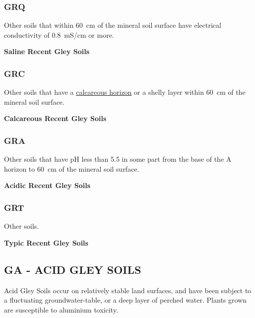 \documentclass[
  letterpaper,
  DIV=11,
  numbers=noendperiod]{scrreprt}
\begin{document}
\hypertarget{sec-key-GRQ}{%
\subsubsection{\texorpdfstring{\textbf{GRQ}}{GRQ}}\label{sec-key-GRQ}}

Other soils that within 60~cm of the mineral soil surface have
electrical conductivity of 0.8~mS/cm or more.

\textbf{Saline Recent Gley Soils}

\hypertarget{sec-key-GRC}{%
\subsubsection{\texorpdfstring{\textbf{GRC}}{GRC}}\label{sec-key-GRC}}

Other soils that have a \protect\hyperlink{sec-diag-calch}{calcareous
horizon} or a shelly layer within 60~cm of the mineral soil surface.

\textbf{Calcareous Recent Gley Soils}

\hypertarget{sec-key-GRA}{%
\subsubsection{\texorpdfstring{\textbf{GRA}}{GRA}}\label{sec-key-GRA}}

Other soils that have pH less than 5.5 in some part from the base of the
A horizon to 60~cm of the mineral soil surface.

\textbf{Acidic Recent Gley Soils}

\hypertarget{sec-key-GRT}{%
\subsubsection{\texorpdfstring{\textbf{GRT}}{GRT}}\label{sec-key-GRT}}

Other soils.

\textbf{Typic Recent Gley Soils}

\hypertarget{sec-GA}{%
\subsection{\texorpdfstring{\textbf{GA} - ACID GLEY
SOILS}{GA - ACID GLEY SOILS}}\label{sec-GA}}

Acid Gley Soils occur on relatively stable land surfaces, and have been
subject to a fluctuating groundwater-table, or a deep layer of perched
water. Plants grown are susceptible to aluminium toxicity.
\end{document}
